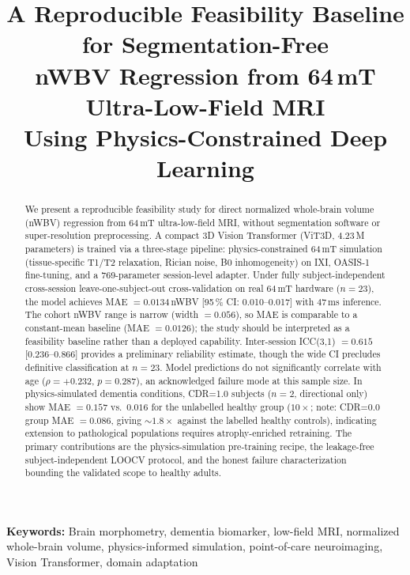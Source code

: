 \documentclass[12pt,a4paper]{article}
\begin{document}
\title{\textbf{A Reproducible Feasibility Baseline for Segmentation-Free\\
nWBV Regression from 64\,mT Ultra-Low-Field MRI\\
Using Physics-Constrained Deep Learning}}

\date{}
\maketitle

\bigskip

\begin{abstract}
We present a reproducible feasibility study for direct normalized
whole-brain volume (nWBV) regression from 64\,mT ultra-low-field MRI,
without segmentation software or super-resolution preprocessing.
A compact 3D Vision Transformer (ViT3D, 4.23\,M parameters) is trained
via a three-stage pipeline: physics-constrained 64\,mT simulation
(tissue-specific T1/T2 relaxation, Rician noise, B0 inhomogeneity) on
IXI, OASIS-1 fine-tuning, and a 769-parameter session-level adapter.
Under fully subject-independent cross-session leave-one-subject-out
cross-validation on real 64\,mT hardware ($n = 23$), the model achieves
MAE $= 0.0134$\,nWBV [95\,\% CI: 0.010--0.017] with 47\,ms inference.
The cohort nWBV range is narrow (width $= 0.056$), so MAE is comparable
to a constant-mean baseline (MAE $= 0.0126$); the study should be
interpreted as a feasibility baseline rather than a deployed capability.
Inter-session ICC(3,1) $= 0.615$ [0.236--0.866] provides a preliminary
reliability estimate, though the wide CI precludes definitive
classification at $n = 23$. Model predictions do not significantly
correlate with age ($\rho = +0.232$, $p = 0.287$), an acknowledged
failure mode at this sample size. In physics-simulated dementia
conditions, CDR=1.0 subjects ($n=2$, directional only) show MAE $= 0.157$
vs.\ $0.016$ for the unlabelled healthy group ($10\times$; note: CDR=0.0
group MAE $= 0.086$, giving $\sim1.8\times$ against the labelled healthy
controls), indicating extension to pathological populations requires
atrophy-enriched retraining. The primary
contributions are the physics-simulation pre-training recipe, the
leakage-free subject-independent LOOCV protocol, and the honest failure
characterization bounding the validated scope to healthy adults.
\end{abstract}

\noindent\textbf{Keywords:}
Brain morphometry, dementia biomarker, low-field MRI, normalized whole-brain
volume, physics-informed simulation, point-of-care neuroimaging,
Vision Transformer, domain adaptation
\end{document}
